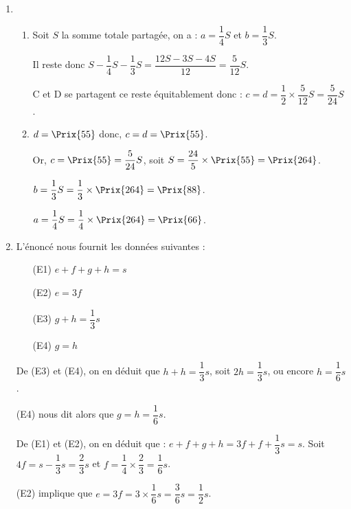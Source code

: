 \begin{enumerate}
    \item
       \begin{enumerate}
          \item Soit $S$ la somme totale partagée, on a : $a =\dfrac14S$ et $b =\dfrac13S$. \par \smallskip
             Il reste donc $S-\dfrac14S-\dfrac13S =\dfrac{12S-3S-4S}{12} =\dfrac{5}{12}S$. \par \smallskip
             C et D se partagent ce reste équitablement donc : $c =d =\dfrac12\times\dfrac{5}{12}S =\dfrac{5}{24}S$. \par
              \smallskip
          \item $d =\Prix{55}$ donc, $c =d =\Prix{55}$. \par \smallskip
             Or, $c =\Prix{55} =\dfrac{5}{24}S$, soit $S =\dfrac{24}{5}\times\Prix{55} =\Prix{264}$. \par \smallskip
             $b =\dfrac13S =\dfrac13\times\Prix{264} =\Prix{88}$. \par \smallskip
             $a =\dfrac14S =\dfrac14\times\Prix{264} =\Prix{66}$. \par \medskip
       \end{enumerate}
    \item L'énoncé nous fournit les données suivantes :
       \begin{itemize}
          \item[(E1)] $e+f+g+h =s$
          \item[(E2)] $e =3f$
          \item[(E3)] $g+h =\dfrac13s$
          \item[(E4)] $g =h$
       \end{itemize}
       De (E3) et (E4), on en déduit que $h+h =\dfrac13s$, soit $2h=\dfrac13s$, ou encore $h=\dfrac16s$. \par
       (E4) nous dit alors que $g =h =\dfrac16s$. \par
       De (E1) et (E2), on en déduit que : $e+f+g+h =3f+f+\dfrac13s =s$. Soit $4f =s-\dfrac13s =\dfrac23s$ et $f =\dfrac14\times\dfrac2{3} =\dfrac16s$. \par
       (E2) implique que $e =3f =3\times\dfrac16s =\dfrac36s =\dfrac12s$. \par \smallskip
 \end{enumerate}